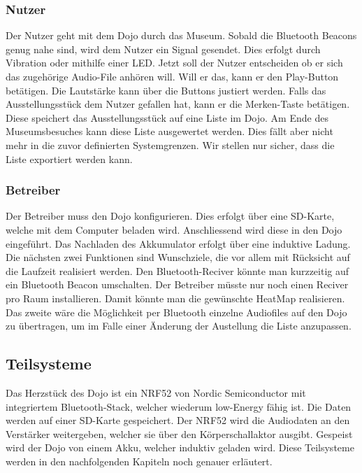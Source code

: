 \subsubsection*{Nutzer}
Der Nutzer geht mit dem Dojo durch das Museum. Sobald die Bluetooth Beacons genug nahe sind, wird dem Nutzer ein Signal gesendet. Dies erfolgt durch Vibration oder mithilfe einer LED. Jetzt soll der Nutzer entscheiden ob er sich das zugehörige Audio-File anhören will. Will er das, kann er den Play-Button betätigen. Die Lautstärke kann über die Buttons justiert werden. Falls das Ausstellungsstück dem Nutzer gefallen hat, kann er die Merken-Taste betätigen. Diese speichert das Ausstellungsstück auf eine Liste im Dojo. Am Ende des Museumsbesuches kann diese Liste ausgewertet werden. Dies fällt aber nicht mehr in die zuvor definierten Systemgrenzen. Wir stellen nur sicher, dass die Liste exportiert werden kann.
\subsubsection*{Betreiber}
Der Betreiber muss den Dojo konfigurieren. Dies erfolgt über eine SD-Karte, welche mit dem Computer beladen wird. Anschliessend wird diese in den Dojo eingeführt. Das Nachladen des Akkumulator erfolgt über eine induktive Ladung. Die nächsten zwei Funktionen sind Wunschziele, die vor allem mit Rücksicht auf die Laufzeit realisiert werden. Den Bluetooth-Reciver könnte man kurzzeitig auf ein Bluetooth Beacon umschalten. Der Betreiber müsste nur noch einen Reciver pro Raum installieren. Damit könnte man die gewünschte HeatMap realisieren. Das zweite wäre die Möglichkeit per Bluetooth einzelne Audiofiles auf den Dojo zu übertragen, um im Falle einer Änderung der Austellung die Liste anzupassen.

\subsection{Teilsysteme}
Das Herzstück des Dojo ist ein NRF52 von Nordic Semiconductor mit integriertem Bluetooth-Stack, welcher wiederum low-Energy fähig ist. Die Daten werden auf einer SD-Karte gespeichert. Der NRF52 wird die Audiodaten an den Verstärker weitergeben, welcher sie über den Körperschallaktor ausgibt. Gespeist wird der Dojo von einem Akku, welcher induktiv geladen wird. Diese Teilsysteme werden in den nachfolgenden Kapiteln noch genauer erläutert.

